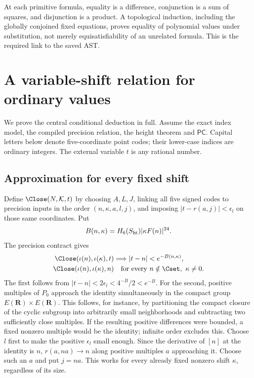 At each primitive formula, equality is a difference, conjunction is
a sum of squares, and disjunction is a product. A topological induction,
including the globally conjoined fixed equations, proves equality of
polynomial values under substitution, not merely equisatisfiability
of an unrelated formula. This is the required link to the saved AST.

\section{A variable-shift relation for ordinary values}\label{sec:bridge}
We prove the central conditional deduction in full. Assume the exact
index model, the compiled precision relation, the height theorem and
$\mathsf{PC}$. Capital letters below denote five-coordinate point codes;
their lower-case indices are ordinary integers. The external variable
$t$ is any rational number.

\subsection{Approximation for every fixed shift}
Define $\Close(N,\mathcal K,t)$ by choosing $A,L,J$, linking all five
signed codes to precision inputs in the order $(n,\kappa,a,l,j)$, and
imposing $|t-r(a,j)|<\epsilon_l$ on those same coordinates. Put
\[
 B(n,\kappa)=H_6(S_{\rm ht})|\kappa F(n)|^{24}.
\]
The precision contract gives
\begin{align}
 \Close(\iota(n),\iota(\kappa),t)&\Longrightarrow
                  |t-n|<e^{-B(n,\kappa)},\label{eq:close-sound}\\
 \Close(\iota(n),\iota(\kappa),n)&\quad\text{for every }
                  n\notin\Cset,\ \kappa\ne0.\label{eq:close-complete}
\end{align}
The first follows from $|t-n|<2\epsilon_l<4^{-B}/2<e^{-B}$.
For the second, positive multiples of $P_0$ approach the identity
simultaneously in the compact group $E(\mathbf R)\times E(\mathbf R)$.
This follows, for instance, by partitioning the compact closure of the
cyclic subgroup into arbitrarily small neighborhoods and subtracting
two sufficiently close multiples. If the resulting positive differences
were bounded, a fixed nonzero multiple would be the identity; infinite
order excludes this. Choose $l$ first to make the positive $\epsilon_l$
small enough. Since the derivative of $[n]$ at the identity is $n$,
$r(a,na)\to n$ along positive multiples $a$ approaching it. Choose such
an $a$ and put $j=na$. This works for every already fixed nonzero shift
$\kappa$, regardless of its size.

